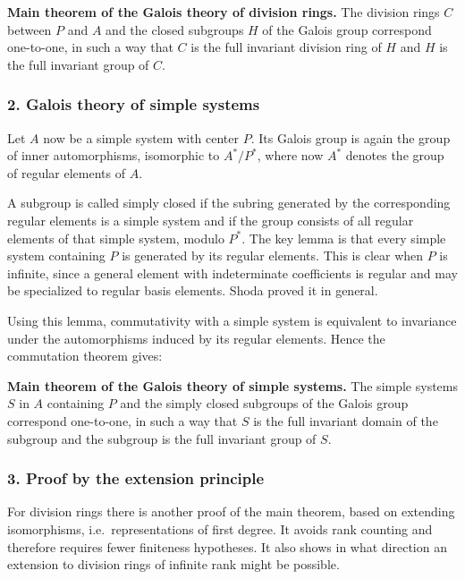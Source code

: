 \documentclass[11pt]{article}
\begin{document}
\textbf{Main theorem of the Galois theory of division rings.} The
division rings \(C\) between \(P\) and \(A\) and the closed subgroups
\(H\) of the Galois group correspond one-to-one, in such a way that
\(C\) is the full invariant division ring of \(H\) and \(H\) is the full
invariant group of \(C\).

\subsubsection{2. Galois theory of simple
systems}\label{galois-theory-of-simple-systems-1}

Let \(A\) now be a simple system with center \(P\). Its Galois group is
again the group of inner automorphisms, isomorphic to \(A^*/P^*\), where
now \(A^*\) denotes the group of regular elements of \(A\).

A subgroup is called simply closed if the subring generated by the
corresponding regular elements is a simple system and if the group
consists of all regular elements of that simple system, modulo \(P^*\).
The key lemma is that every simple system containing \(P\) is generated
by its regular elements. This is clear when \(P\) is infinite, since a
general element with indeterminate coefficients is regular and may be
specialized to regular basis elements. Shoda proved it in general.

Using this lemma, commutativity with a simple system is equivalent to
invariance under the automorphisms induced by its regular elements.
Hence the commutation theorem gives:

\textbf{Main theorem of the Galois theory of simple systems.} The simple
systems \(S\) in \(A\) containing \(P\) and the simply closed subgroups
of the Galois group correspond one-to-one, in such a way that \(S\) is
the full invariant domain of the subgroup and the subgroup is the full
invariant group of \(S\).

\subsubsection{3. Proof by the extension
principle}\label{proof-by-the-extension-principle}

For division rings there is another proof of the main theorem, based on
extending isomorphisms, i.e.~representations of first degree. It avoids
rank counting and therefore requires fewer finiteness hypotheses. It
also shows in what direction an extension to division rings of infinite
rank might be possible.
\end{document}
